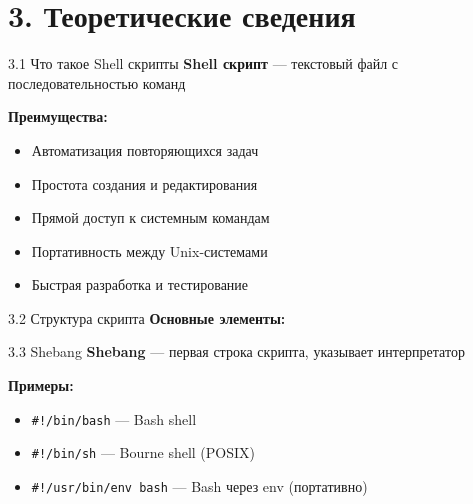 \documentclass[
  ignorenonframetext,
  aspectratio=169,
  russian,
]{beamer}
\newenvironment{Shaded}{\begin{snugshade}}{\end{snugshade}}
\newcommand{\BuiltInTok}[1]{\textcolor[rgb]{0.00,0.23,0.31}{#1}}
\newcommand{\CommentTok}[1]{\textcolor[rgb]{0.37,0.37,0.37}{#1}}
\newcommand{\ControlFlowTok}[1]{\textcolor[rgb]{0.00,0.23,0.31}{\textbf{#1}}}
\newcommand{\DataTypeTok}[1]{\textcolor[rgb]{0.68,0.00,0.00}{#1}}
\newcommand{\DecValTok}[1]{\textcolor[rgb]{0.68,0.00,0.00}{#1}}
\newcommand{\KeywordTok}[1]{\textcolor[rgb]{0.00,0.23,0.31}{\textbf{#1}}}
\newcommand{\NormalTok}[1]{\textcolor[rgb]{0.00,0.23,0.31}{#1}}
\newcommand{\OperatorTok}[1]{\textcolor[rgb]{0.37,0.37,0.37}{#1}}
\newcommand{\StringTok}[1]{\textcolor[rgb]{0.13,0.47,0.30}{#1}}
\newcommand{\VariableTok}[1]{\textcolor[rgb]{0.07,0.07,0.07}{#1}}
\providecommand{\tightlist}{%
  \setlength{\itemsep}{0pt}\setlength{\parskip}{0pt}}
\begin{document}
\section{3. Теоретические
сведения}\label{ux442ux435ux43eux440ux435ux442ux438ux447ux435ux441ux43aux438ux435-ux441ux432ux435ux434ux435ux43dux438ux44f}

\begin{frame}{3.1 Что такое Shell скрипты}
\label{ux447ux442ux43e-ux442ux430ux43aux43eux435-shell-ux441ux43aux440ux438ux43fux442ux44b}
\textbf{Shell скрипт} --- текстовый файл с последовательностью команд

\textbf{Преимущества:}

\begin{itemize}[<+->]
\tightlist
\item
  Автоматизация повторяющихся задач
\item
  Простота создания и редактирования
\item
  Прямой доступ к системным командам
\item
  Портативность между Unix-системами
\item
  Быстрая разработка и тестирование
\end{itemize}
\end{frame}

\begin{frame}[fragile]{3.2 Структура скрипта}
\label{ux441ux442ux440ux443ux43aux442ux443ux440ux430-ux441ux43aux440ux438ux43fux442ux430}
\textbf{Основные элементы:}

\begin{Shaded}
\end{Shaded}
\end{frame}

\begin{frame}[fragile]{3.3 Shebang}
\label{shebang}
\textbf{Shebang} --- первая строка скрипта, указывает интерпретатор

\textbf{Примеры:}

\begin{itemize}[<+->]
\tightlist
\item
  \texttt{\#!/bin/bash} --- Bash shell
\item
  \texttt{\#!/bin/sh} --- Bourne shell (POSIX)
\item
  \texttt{\#!/usr/bin/env\ bash} --- Bash через env (портативно)
\end{itemize}
\end{frame}
\end{document}
